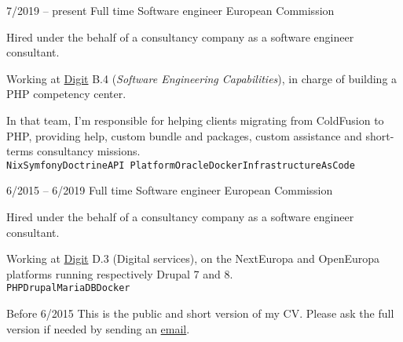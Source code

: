 \begin{entrylist}
	\entry
		{7/2019 -- present}
        {Full time}
		{Software engineer}
        {European Commission}
        {
			Hired under the behalf of a consultancy company as a software engineer consultant.

			Working at \href{https://ec.europa.eu/info/departments/informatics_en}{Digit} B.4 (\textit{Software Engineering Capabilities}),
			in charge of building a PHP competency center.

			In that team, I'm responsible for helping clients migrating from ColdFusion to PHP, providing help,
			custom bundle and packages, custom assistance and short-terms consultancy missions.
			\\ \texttt{Nix}\slashsep\texttt{Symfony}\slashsep\texttt{Doctrine}\slashsep\texttt{API Platform}\slashsep\texttt{Oracle}\slashsep\texttt{Docker}\slashsep\texttt{InfrastructureAsCode}
        }
	\entry
		{6/2015 -- 6/2019}
        {Full time}
		{Software engineer}
        {European Commission}
        {
			Hired under the behalf of a consultancy company as a software engineer consultant.

			Working at \href{https://ec.europa.eu/info/departments/informatics_en}{Digit} D.3 (Digital services),
			on the NextEuropa and OpenEuropa platforms running respectively Drupal 7 and 8.
			\\ \texttt{PHP}\slashsep\texttt{Drupal}\slashsep\texttt{MariaDB}\slashsep\texttt{Docker}
        }
    \entry
        {\color{black!50}Before 6/2015}
        {}
        {}
        {}
        {\footnotesize{\color{black!50}This is the public and short version of my CV. Please ask the full version if needed by sending an \href{mailto:pol.dellaiera@protonmail.com}{email}.}}
\end{entrylist}


